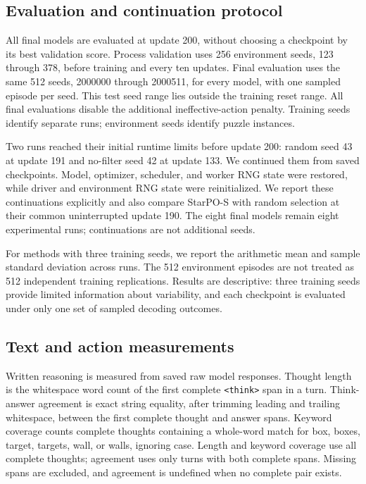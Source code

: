\documentclass[10pt,twocolumn,letterpaper]{article}
\begin{document}
\subsection{Evaluation and continuation protocol}
All final models are evaluated at update 200, without choosing a checkpoint by its best validation score. Process validation uses 256 environment seeds, 123 through 378, before training and every ten updates. Final evaluation uses the same 512 seeds, 2000000 through 2000511, for every model, with one sampled episode per seed. This test seed range lies outside the training reset range. All final evaluations disable the additional ineffective-action penalty. Training seeds identify separate runs; environment seeds identify puzzle instances.

Two runs reached their initial runtime limits before update 200: random seed 43 at update 191 and no-filter seed 42 at update 133. We continued them from saved checkpoints. Model, optimizer, scheduler, and worker RNG state were restored, while driver and environment RNG state were reinitialized. We report these continuations explicitly and also compare StarPO-S with random selection at their common uninterrupted update 190. The eight final models remain eight experimental runs; continuations are not additional seeds.

For methods with three training seeds, we report the arithmetic mean and sample standard deviation across runs. The 512 environment episodes are not treated as 512 independent training replications. Results are descriptive: three training seeds provide limited information about variability, and each checkpoint is evaluated under only one set of sampled decoding outcomes.

\subsection{Text and action measurements}
Written reasoning is measured from saved raw model responses. Thought length is the whitespace word count of the first complete \texttt{<think>} span in a turn. Think-answer agreement is exact string equality, after trimming leading and trailing whitespace, between the first complete thought and answer spans. Keyword coverage counts complete thoughts containing a whole-word match for box, boxes, target, targets, wall, or walls, ignoring case. Length and keyword coverage use all complete thoughts; agreement uses only turns with both complete spans. Missing spans are excluded, and agreement is undefined when no complete pair exists.
\end{document}
